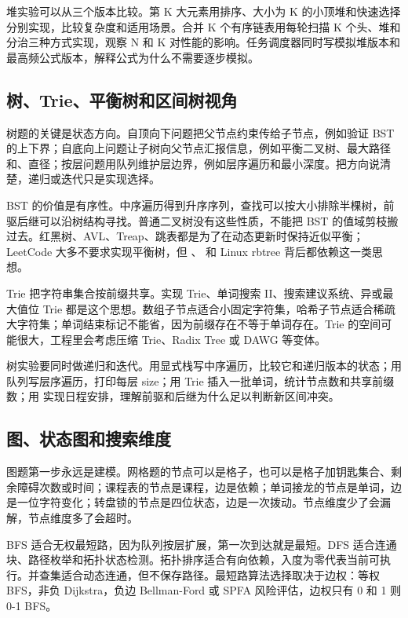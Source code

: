 堆实验可以从三个版本比较。第 K 大元素用排序、大小为 K 的小顶堆和快速选择分别实现，比较复杂度和适用场景。合并 K 个有序链表用每轮扫描 K 个头、堆和分治三种方式实现，观察 N 和 K 对性能的影响。任务调度器同时写模拟堆版本和最高频公式版本，解释公式为什么不需要逐步模拟。

\subsection{树、Trie、平衡树和区间树视角}

树题的关键是状态方向。自顶向下问题把父节点约束传给子节点，例如验证 BST 的上下界；自底向上问题让子树向父节点汇报信息，例如平衡二叉树、最大路径和、直径；按层问题用队列维护层边界，例如层序遍历和最小深度。把方向说清楚，递归或迭代只是实现选择。

BST 的价值是有序性。中序遍历得到升序序列，查找可以按大小排除半棵树，前驱后继可以沿树结构寻找。普通二叉树没有这些性质，不能把 BST 的值域剪枝搬过去。红黑树、AVL、Treap、跳表都是为了在动态更新时保持近似平衡；LeetCode 大多不要求实现平衡树，但 、 和 Linux rbtree 背后都依赖这一类思想。

Trie 把字符串集合按前缀共享。实现 Trie、单词搜索 II、搜索建议系统、异或最大值位 Trie 都是这个思想。数组子节点适合小固定字符集，哈希子节点适合稀疏大字符集；单词结束标记不能省，因为前缀存在不等于单词存在。Trie 的空间可能很大，工程里会考虑压缩 Trie、Radix Tree 或 DAWG 等变体。

树实验要同时做递归和迭代。用显式栈写中序遍历，比较它和递归版本的状态；用队列写层序遍历，打印每层 size；用 Trie 插入一批单词，统计节点数和共享前缀数；用  实现日程安排，理解前驱和后继为什么足以判断新区间冲突。

\subsection{图、状态图和搜索维度}

图题第一步永远是建模。网格题的节点可以是格子，也可以是格子加钥匙集合、剩余障碍次数或时间；课程表的节点是课程，边是依赖；单词接龙的节点是单词，边是一位字符变化；转盘锁的节点是四位状态，边是一次拨动。节点维度少了会漏解，节点维度多了会超时。

BFS 适合无权最短路，因为队列按层扩展，第一次到达就是最短。DFS 适合连通块、路径枚举和拓扑状态检测。拓扑排序适合有向依赖，入度为零代表当前可执行。并查集适合动态连通，但不保存路径。最短路算法选择取决于边权：等权 BFS，非负 Dijkstra，负边 Bellman-Ford 或 SPFA 风险评估，边权只有 0 和 1 则 0-1 BFS。

